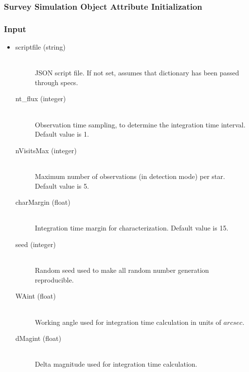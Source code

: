 \documentclass[cleanfoot]{asme2ej}
\begin{document}
\subsubsection{Survey Simulation Object Attribute Initialization}

\subsubsection*{Input}
\begin{itemize}
\item 
\begin{description}
    \item[scriptfile (string)] \hfill \\ JSON script file.  If not set, assumes that dictionary has been passed through specs.
    \item[nt\_flux (integer)] \hfill \\ Observation time sampling, to determine the integration time interval. Default value is 1.
    \item[nVisitsMax (integer)] \hfill \\ Maximum number of observations (in detection mode) per star. Default value is 5.
    \item[charMargin (float)] \hfill \\ Integration time margin for characterization. Default value is 15.
    \item[seed (integer)] \hfill \\ Random seed used to make all random number generation reproducible.
    \item[WAint (float)] \hfill \\ Working angle used for integration time calculation in units of $arcsec$.
    \item[dMagint (float)] \hfill \\ Delta magnitude used for integration time calculation.
\end{description}
\end{itemize}
\end{document}
